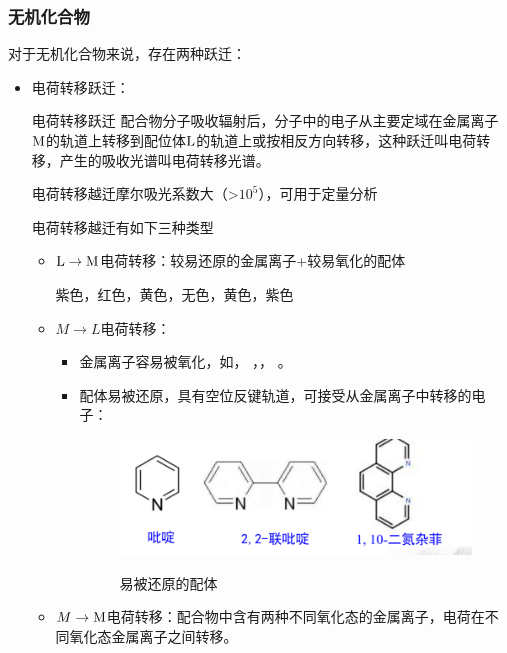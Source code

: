\subsubsection*{无机化合物}
对于无机化合物来说，存在两种跃迁：
\begin{itemize}
    \item 电荷转移跃迁：
    \begin{definition*}{电荷转移跃迁}
        配合物分子吸收辐射后，分子中的电子从主要定域在金属离子$\ce{M}$的轨道上转移到配位体$\ce{L}$的轨道上或按相反方向转移，这种跃迁叫电荷转移，产生的吸收光谱叫电荷转移光谱。
    \end{definition*}
    \begin{note}
        电荷转移越迁摩尔吸光系数大（>$10^{5}$），可用于定量分析
    \end{note}
    电荷转移越迁有如下三种类型
    \begin{itemize}
        \item $\ce{L}\rightarrow \ce{M}$电荷转移：较易还原的金属离子+较易氧化的配体
        \begin{example}
             紫色，红色，黄色，无色，黄色，紫色
        \end{example}
        \item $M\rightarrow L$电荷转移：
        \begin{itemize}
            \item 金属离子容易被氧化，如， ，， 。
            \item 配体易被还原，具有空位反键轨道，可接受从金属离子中转移的电子：
            \begin{figure}[h]
                \centering
                \includegraphics[width=10cm]{image/chp3_L.png}
                \label{fig:chp3L}
                \caption{易被还原的配体}
            \end{figure}
        \end{itemize}
        \item $M\rightarrow \ce{M}$电荷转移：配合物中含有两种不同氧化态的金属离子，电荷在不同氧化态金属离子之间转移。
        \begin{figure}[h]

\end{figure}
\end{itemize}
\end{itemize}
